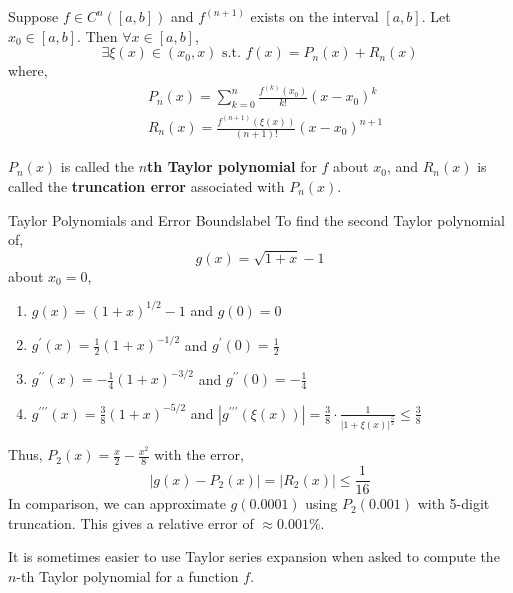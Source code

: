 \begin{thm}
    Suppose $f \in C^n([a, b])$ and $f^{(n+1)}$ exists on the interval $[a, b]$. Let $x_0 \in [a, b]$. Then $\forall x \in[a, b]$,
    \[\exists \xi(x) \in (x_0, x) \text{ s.t. } f(x)=P_n(x)+R_n(x)\]
    where,
    \begin{align*}
    &P_n(x) =\sum_{k=0}^n \frac{f^{(k)}\left(x_0\right)}{k !}\left(x-x_0\right)^k \\
    &R_n(x)=\frac{f^{(n+1)}(\xi(x))}{(n+1) !}\left(x-x_0\right)^{n+1}
    \end{align*}    
\end{thm}

\begin{rmk}
    $P_n(x)$ is called the \textbf{$n$th Taylor polynomial} for $f$ about $x_0$, and $R_n(x)$ is called the \textbf{truncation error} associated with $P_n(x)$.
\end{rmk}

\begin{ex}{Taylor Polynomials and Error Bounds}{label}
To find the second Taylor polynomial of,
\[g(x) = \sqrt{1 + x} - 1\]
about $x_0 = 0$,
\begin{enumerate}
    \item $g(x) = (1 + x)^{1/2} - 1$ and $g(0) = 0$
    \item $g^{\prime}(x) = \frac{1}{2}(1 + x)^{-1/2}$ and $g^{\prime}(0) = \frac{1}{2}$
    \item $g^{\prime\prime}(x) = -\frac{1}{4}(1 + x)^{-3/2}$ and $g^{\prime\prime}(0) = -\frac{1}{4}$
    \item $g^{\prime\prime\prime}(x) = \frac{3}{8}(1 + x)^{-5/2}$ and $|g^{\prime\prime\prime}(\xi(x))| = \frac{3}{8} \cdot \frac{1}{|1 + \xi(x)|^{\frac{5}{2}}} \leq \frac{3}{8}$
\end{enumerate}
Thus, $P_2(x) = \frac{x}{2} - \frac{x^2}{8}$ with the error,
\[|g(x) - P_2(x)| = |R_2(x)| \leq \frac{1}{16}\]
In comparison, we can approximate $g(0.0001)$ using $P_2(0.001)$ with 5-digit truncation. This gives a relative error of $\approx 0.001 \%$.
\end{ex}

\begin{rmk}
    It is sometimes easier to use Taylor series expansion when asked to compute the $n$-th Taylor polynomial for a function $f$.
\end{rmk}

